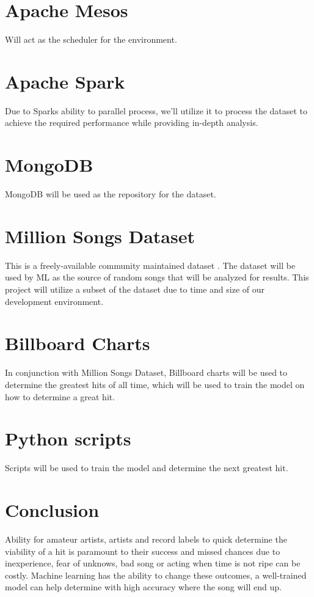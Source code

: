\documentclass[9pt,twocolumn,twoside]{../../styles/osajnl}
\begin{document}
\section*{Apache Mesos}
Will act as the scheduler for the environment.

\section*{Apache Spark}
Due to Sparks ability to parallel process, we’ll utilize it to process
the dataset to achieve the required performance while providing
in-depth analysis.

\section*{MongoDB}
MongoDB will be used as the repository for the dataset.

\section{Million Songs Dataset}
This is a freely-available community maintained dataset  \cite{www-millionsong}. The dataset
will be used by ML as the source of random songs that will be analyzed
for results. This project will utilize a subset of the dataset due to
time and size of our development environment. 

\section*{Billboard Charts}
In conjunction with Million Songs Dataset, Billboard charts  \cite{www-billboard} will be
used to determine the greatest hits of all time, which will be used to
train the model on how to determine a great hit. 

\section*{Python scripts}
Scripts will be used to train the model and determine the next
greatest hit.


\section{Conclusion}

Ability for amateur artists, artists and record labels to quick
determine the viability of a hit is paramount to their success and
missed chances due to inexperience, fear of unknows, bad song or
acting when time is not ripe can be costly. Machine learning has the
ability to change these outcomes, a well-trained model can help
determine with high accuracy where the song will end up. 




 
\end{document}
